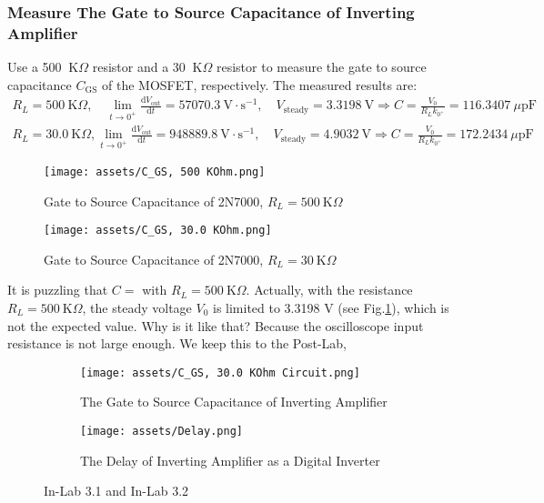 \documentclass[UTF8]{report}
\def\KO{\ \mathrm{K}\Omega}
\def\pF{\ \mu\mathrm{pF}}
\theoremstyle{MyLineTheoremStyle} %
\theoremstyle{MyBlockTheoremStyle} %
\theoremstyle{MySubsubsectionStyle} %
\begin{document}
\subsubsection{Measure The Gate to Source Capacitance of Inverting Amplifier}
Use a 500 $\KO$ resistor and a 30 $\KO$ resistor to measure the gate to source capacitance $C_{\text{GS}}$ of the MOSFET, respectively. The measured results are:
\begin{gather}
R_L = 500 \KO ,\quad \lim_{t \to 0^+} \frac{\mathrm{d} V_{\text{out}} }{\mathrm{d} t } = 57070.3 \ \mathrm{V\cdot s^{-1}},\quad V_{\text{steady}} =  3.3198 \ \mathrm{V} 
\Longrightarrow C = \frac{V_0}{R_L k_{0^+}} = 116.3407 \pF
\\
R_L = 30.0 \KO ,\lim_{t \to 0^+} \frac{\mathrm{d} V_{\text{out}} }{\mathrm{d} t } = 948889.8 \ \mathrm{V\cdot s^{-1}},\quad V_{\text{steady}} = 4.9032 \ \mathrm{V} 
\Longrightarrow C = \frac{V_0}{R_L k_{0^+}} = 172.2434 \pF
\end{gather}
\begin{figure}[H]\centering
    \texttt{[image: assets/C\_GS, 500 KOhm.png]}
    \caption{Gate to Source Capacitance of 2N7000, $R_L = 500 \KO$}
    \label{500 KOhm}
\end{figure}
\begin{figure}[H]\centering
    \texttt{[image: assets/C\_GS, 30.0 KOhm.png]}
    \caption{Gate to Source Capacitance of 2N7000, $R_L = 30 \KO$}
\end{figure}
It is puzzling that $C = $ with $R_L = 500 \KO$. Actually, with the resistance $R_L = 500 \KO$, the steady voltage $V_0$ is limited to 3.3198 V (see Fig.\ref{500 KOhm}), which is not the expected value. Why is it like that? Because the oscilloscope input resistance is not large enough. We keep this to the Post-Lab, 

\begin{figure}[H]\centering
\begin{subfigure}[b]{0.5\columnwidth}\centering
    \texttt{[image: assets/C\_GS, 30.0 KOhm Circuit.png]}
    \caption{The Gate to Source Capacitance of Inverting Amplifier}
\end{subfigure}\hfill
\begin{subfigure}[b]{0.5\columnwidth}\centering
    \texttt{[image: assets/Delay.png]}
    \caption{The Delay of Inverting Amplifier as a Digital Inverter}
\end{subfigure}
\caption{In-Lab 3.1 and In-Lab 3.2}
\label{In-Lab 3.1 and In-Lab 3.2}
\end{figure}
\end{document}
